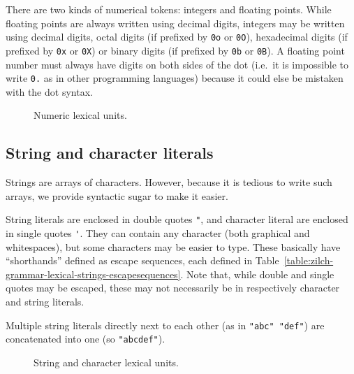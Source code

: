 There are two kinds of numerical tokens: integers and floating points.
While floating points are always written using decimal digits, integers may be written using decimal digits, octal digits (if prefixed by \verb|0o| or \verb|0O|), hexadecimal digits (if prefixed by \verb|0x| or \verb|0X|) or binary digits (if prefixed by \verb|0b| or \verb|0B|).
A floating point number must always have digits on both sides of the dot (i.e.\ it is impossible to write \verb|0.| as in other programming languages) because it could else be mistaken with the dot syntax.

\begin{figure}[H]
	\centering


	\caption{Numeric lexical units.}
	\label{fig:zilch-grammar-lexical-numbers-grammar}
\end{figure}

\subsection{String and character literals}\label{subsec:zilch-grammar-lexical-strings}

Strings are arrays of characters.
However, because it is tedious to write such arrays, we provide syntactic sugar to make it easier.

String literals are enclosed in double quotes \verb|"|, and character literal are enclosed in single quotes \verb|'|.
They can contain any character (both graphical and whitespaces), but some characters may be easier to type.
These basically have ``shorthands'' defined as escape sequences, each defined in Table~\ref{table:zilch-grammar-lexical-strings-escapesequences}.
Note that, while double and single quotes may be escaped, these may not necessarily be in respectively character and string literals.

Multiple string literals directly next to each other (as in \texttt{"abc" "def"}) are concatenated into one (so \texttt{"abcdef"}).

\begin{figure}[H]
	\centering


	\caption{String and character lexical units.}
	\label{fig:zilch-grammar-lexical-strings-grammar}
\end{figure}

